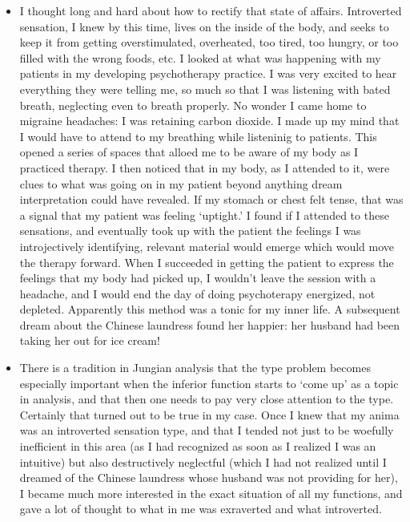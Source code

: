 \begin{itemize}
\item I thought long and hard about how to rectify that state of affairs.
Introverted sensation, I knew by this time, lives on the inside of the body,
and seeks to keep it from getting overstimulated, overheated, too tired, too
hungry, or too filled with the wrong foods, etc. I looked at what was happening
with my patients in my developing psychotherapy practice. I was very excited to
hear everything they were telling me, so much so that I was listening with
bated breath, neglecting even to breath properly. No wonder I came home to
migraine headaches: I was retaining carbon dioxide. I made up my mind that I
would have to attend to my breathing while listeninig to patients. This opened
a series of spaces that alloed me to be aware of my body as I practiced
therapy. I then noticed that in my body, as I attended to it, were clues to
what was going on in my patient beyond anything dream interpretation could have
revealed. If my stomach or chest felt tense, that was a signal that my patient
was feeling `uptight.' I found if I attended to these sensations, and
eventually took up with the patient the feelings I was introjectively
identifying, relevant material would emerge which would move the therapy
forward. When I succeeded in getting the patient to express the feelings that
my body had picked up, I wouldn't leave the session with a headache, and I
would end the day of doing psychoterapy energized, not depleted. Apparently
this method was a tonic for my inner life. A subsequent dream about the Chinese
laundress found her happier: her husband had been taking her out for ice cream!

\item There is a tradition in Jungian analysis that the type problem becomes
especially important when the inferior function starts to `come up' as a topic
in analysis, and that then one needs to pay very close attention to the type.
Certainly that turned out to be true in my case. Once I knew that my anima was
an introverted sensation type, and that I tended not just to be woefully
inefficient in this area (as I had recognized as soon as I realized I was an
intuitive) but also destructively neglectful (which I had not realized until I
dreamed of the Chinese laundress whose husband was not providing for her), I
became much more interested in the exact situation of all my functions, and
gave a lot of thought to what in me was exraverted and what introverted.


\end{itemize}
